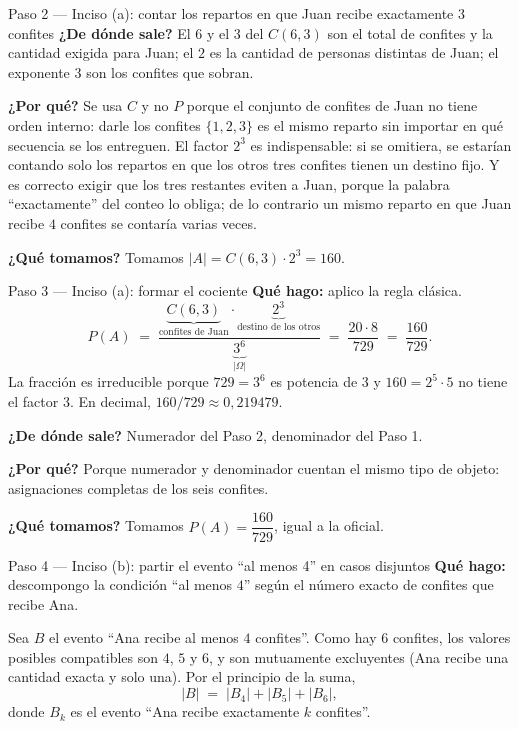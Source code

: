 \documentclass[11pt]{article}
\begin{document}
\begin{sol}
\begin{paso}{Paso 2 --- Inciso (a): contar los repartos en que Juan recibe exactamente 3 confites}
\textbf{¿De d\'onde sale?} El $6$ y el $3$ del $C(6,3)$ son el total de confites y la cantidad exigida para Juan; el $2$ es la cantidad de personas distintas de Juan; el exponente $3$ son los confites que sobran.

\textbf{¿Por qu\'e?} Se usa $C$ y no $P$ porque el conjunto de confites de Juan no tiene orden interno: darle los confites $\{1,2,3\}$ es el mismo reparto sin importar en qu\'e secuencia se los entreguen. El factor $2^{3}$ es indispensable: si se omitiera, se estar\'ian contando solo los repartos en que los otros tres confites tienen un destino fijo. Y es correcto exigir que los tres restantes eviten a Juan, porque la palabra ``exactamente'' del conteo lo obliga; de lo contrario un mismo reparto en que Juan recibe $4$ confites se contar\'ia varias veces.

\textbf{¿Qu\'e tomamos?} Tomamos $|A|=C(6,3)\cdot 2^{3}=160$.
\end{paso}

\begin{paso}{Paso 3 --- Inciso (a): formar el cociente}
\textbf{Qu\'e hago:} aplico la regla cl\'asica.
\[
P(A)\;=\;\frac{\underbrace{C(6,3)}_{\text{confites de Juan}}\cdot\underbrace{2^{3}}_{\text{destino de los otros}}}{\underbrace{3^{6}}_{|\Omega|}}
\;=\;\frac{20\cdot 8}{729}\;=\;\frac{160}{729}.
\]
La fracci\'on es irreducible porque $729=3^{6}$ es potencia de $3$ y $160=2^{5}\cdot 5$ no tiene el factor $3$. En decimal, $160/729\approx 0{,}219479$.

\textbf{¿De d\'onde sale?} Numerador del Paso 2, denominador del Paso 1.

\textbf{¿Por qu\'e?} Porque numerador y denominador cuentan el mismo tipo de objeto: asignaciones completas de los seis confites.

\textbf{¿Qu\'e tomamos?} Tomamos $P(A)=\dfrac{160}{729}$, igual a la oficial.
\end{paso}

\begin{paso}{Paso 4 --- Inciso (b): partir el evento ``al menos 4'' en casos disjuntos}
\textbf{Qu\'e hago:} descompongo la condici\'on ``al menos $4$'' seg\'un el n\'umero exacto de confites que recibe Ana.

Sea $B$ el evento ``Ana recibe al menos $4$ confites''. Como hay $6$ confites, los valores posibles compatibles son $4$, $5$ y $6$, y son mutuamente excluyentes (Ana recibe una cantidad exacta y solo una). Por el principio de la suma,
\[
|B| \;=\; |B_4| + |B_5| + |B_6|,
\]
donde $B_k$ es el evento ``Ana recibe exactamente $k$ confites''.


\end{paso}
\end{sol}
\end{document}
